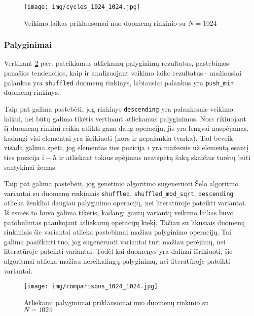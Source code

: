 \documentclass{VUMIFInfBakalaurinis}
\begin{document}
\begin{figure}[H]
  \centering
  \texttt{[image: img/cycles\_1024\_1024.jpg]}
  \caption{Veikimo laikas priklausomai nuo duomenų rinkinio su $N = 1024$}
  \label{img:cycles_1024_1024}
\end{figure}

\pagebreak

\subsubsection{Palyginimai}

Vertinant \ref{img:comparisons_1024_1024} pav. pateikiamus atliekamų palyginimų rezultatus, pastebimos panašios tendencijos,
kaip ir analizuojant veikimo laiko rezultatus - mažiausiai palankus yra \verb|shuffled| duomenų rinkinys, labiausiai palankus yra \verb|push_min| duomenų rinkinys.

Taip pat galima pastebėti, jog rinkinys \verb|descending| yra palankesnis veikimo laikui, nei būtų galima tikėtis vertinant atliekamus palyginimus.
Nors rikiuojant šį duomenų rinkinį reikia atlikti gana daug operacijų, jis yra lengvai nuspėjamas,
kadangi visi elementai yra išrikiuoti (nors ir nepalankia tvarka).
Tad beveik visada galima spėti, jog elementas ties pozicija $i$ yra mažesnis už elementą esantį ties pozicija $i - h$
ir atliekant tokius spėjimus neatspėtų šakų skaičius turėtų būti santykinai žemas.

Taip pat galima pastebėti, jog genetinio algoritmo sugeneruoti Šelo algoritmo variantai su duomenų rinkiniais \verb|shuffled|, \verb|shuffled_mod_sqrt|, \verb|descending|
atlieka ženkliai daugiau palyginimo operacijų, nei literatūroje pateikti variantai.
Iš esmės to buvo galima tikėtis, kadangi gautų variantų veikimo laikas buvo patobulintas paaukojant atliekamų operacijų kiekį.
Tačiau su likusiais duomenų rinkiniais šie variantai atlieka pastebimai mažiau palyginimo operacijų.
Tai galima paaiškinti tuo, jog sugeneruoti variantai turi mažiau perėjimų, nei literatūroje pateikti variantai.
Todėl kai duomenys yra dalinai išrikiuoti, šie algoritmai atlieka mažiau nereikalingų palyginimų, nei literatūroje pateikti variantai. 

\begin{figure}[H]
  \centering
  \texttt{[image: img/comparisons\_1024\_1024.jpg]}
  \caption{Atliekami palyginimai priklausomai nuo duomenų rinkinio su $N = 1024$}
  \label{img:comparisons_1024_1024}
\end{figure}
\end{document}
